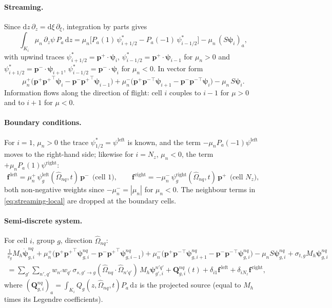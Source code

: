 \documentclass[11pt,a4paper]{article}
\numberwithin{equation}{section}
\theoremstyle{remark}
\newcommand{\Om}{\hat{\Omega}}
\newcommand{\dd}{\mathrm{d}}
\newcommand{\pp}{{\bm{p}^{+}}}
\newcommand{\pmn}{{\bm{p}^{-}}}
\begin{document}
\paragraph{Streaming.} Since $\dd z\,\partial_z=\dd\xi\,\partial_\xi$, integration by parts gives
\begin{equation}
\int_{K_i}\mu_n\,\partial_z\psi\,P_a\,\dd z=\mu_n\big[P_a(1)\,\psi^*_{i+1/2}-P_a(-1)\,\psi^*_{i-1/2}\big]-\mu_n\,(S\bm\psi_i)_a ,
\end{equation}
with upwind traces $\psi^*_{i+1/2}=\pp\cdot\bm\psi_i$, $\psi^*_{i-1/2}=\pp\cdot\bm\psi_{i-1}$ for $\mu_n>0$ and $\psi^*_{i+1/2}=\pmn\cdot\bm\psi_{i+1}$, $\psi^*_{i-1/2}=\pmn\cdot\bm\psi_i$ for $\mu_n<0$. In vector form
\begin{equation}
\mu_n^+\big(\pp\pp^{\!\top}\bm\psi_i-\pmn\pp^{\!\top}\bm\psi_{i-1}\big)
+\mu_n^-\big(\pp\pmn^{\!\top}\bm\psi_{i+1}-\pmn\pmn^{\!\top}\bm\psi_i\big)
-\mu_n\,S\bm\psi_i .
\label{eq:streaming-local}
\end{equation}
Information flows along the direction of flight: cell $i$ couples to $i-1$ for $\mu>0$ and to $i+1$ for $\mu<0$.

\paragraph{Boundary conditions.}
For $i=1$, $\mu_n>0$ the trace $\psi^*_{1/2}=\psi^{\mathrm{left}}$ is known, and the term $-\mu_nP_a(-1)\psi^{\mathrm{left}}$ moves to the right-hand side; likewise for $i=N_z$, $\mu_n<0$, the term $+\mu_nP_a(1)\psi^{\mathrm{right}}$:
\begin{equation}
\bm f^{\,\mathrm{left}}=\mu_n^+\,\psi^{\mathrm{left}}_g(\Om_{nq},t)\,\pmn\ \ \text{(cell 1)},\qquad
\bm f^{\,\mathrm{right}}=-\mu_n^-\,\psi^{\mathrm{right}}_g(\Om_{nq},t)\,\pp\ \ \text{(cell $N_z$)},
\label{eq:bc}
\end{equation}
both non-negative weights since $-\mu^-_n=|\mu_n|$ for $\mu_n<0$. The neighbour terms in \eqref{eq:streaming-local} are dropped at the boundary cells.

\paragraph{Semi-discrete system.}
For cell $i$, group $g$, direction $\Om_{nq}$:
\begin{multline}
\frac{1}{v_g}M_h\dot{\bm\psi}^{nq}_{g,i}
+\mu_n^+\big(\pp\pp^{\!\top}\bm\psi^{nq}_{g,i}-\pmn\pp^{\!\top}\bm\psi^{nq}_{g,i-1}\big)
+\mu_n^-\big(\pp\pmn^{\!\top}\bm\psi^{nq}_{g,i+1}-\pmn\pmn^{\!\top}\bm\psi^{nq}_{g,i}\big)
-\mu_nS\bm\psi^{nq}_{g,i}
+\sigma_{t,g}M_h\bm\psi^{nq}_{g,i}\\
=\sum_{g'}\sum_{n',q'}w_{n'}w_{q'}\,\sigma_{s,g'\to g}(\Om_{nq}\cdot\Om_{n'q'})\,M_h\bm\psi^{n'q'}_{g',i}
+\bm Q^{nq}_{g,i}(t)+\delta_{i1}\bm f^{\,\mathrm{left}}+\delta_{iN_z}\bm f^{\,\mathrm{right}},
\label{eq:semidiscrete}
\end{multline}
where $(\bm Q^{nq}_{g,i})_a=\int_{K_i}Q_g(z,\Om_{nq},t)P_a\,\dd z$ is the projected source (equal to $M_h$ times its Legendre coefficients).
\end{document}
